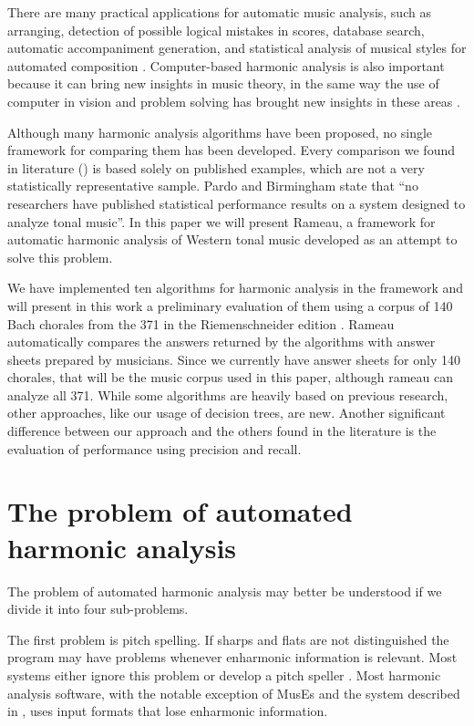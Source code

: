 \documentclass{article}
\begin{document}
There are many practical applications for automatic music analysis,
such as arranging, detection of possible logical mistakes in scores,
database search, automatic accompaniment generation, and statistical
analysis of musical styles for automated composition
\cite{pardo.ea:algorithms,temperley.ea:modeling}. Computer-based
harmonic analysis is also important because it can bring new insights
in music theory, in the same way the use of computer in vision and
problem solving has brought new insights in these areas
\cite{temperley.ea:modeling}.

Although many harmonic analysis algorithms have been proposed, no
single framework for comparing them has been developed. Every
comparison we found in literature (\cite{pardo.ea:automated,
  barthelemy.ea:figured, tsui:harmonic, taube:automatic,
  illescas.ea:harmonic}) is based solely on published examples, which
are not a very statistically representative sample. Pardo and
Birmingham \cite{pardo.ea:automated} state that ``no researchers have
published statistical performance results on a system designed to
analyze tonal music''. In this paper we will present Rameau, a
framework for automatic harmonic analysis of Western tonal music
developed as an attempt to solve this problem.

We have implemented ten algorithms for harmonic analysis in the
framework and will present in this work a preliminary evaluation of
them using a corpus of 140 Bach chorales from the 371 in the
Riemenschneider edition \cite{bach:371}. Rameau automatically compares
the answers returned by the algorithms with answer sheets prepared by
musicians. Since we currently have answer sheets for only 140
chorales, that will be the music corpus used in this paper, although
rameau can analyze all 371. While some algorithms are heavily based on
previous research, other approaches, like our usage of decision trees,
are new. Another significant difference between our approach and the
others found in the literature is the evaluation of performance using
precision and recall.

\section{The problem of automated harmonic analysis}
\label{sec:problem}

The problem of automated harmonic analysis may better be understood if
we divide it into four sub-problems.

The first problem is pitch spelling. If sharps and flats are not
distinguished the program may have problems whenever enharmonic
information is relevant. Most systems either ignore this problem or
develop a pitch speller \cite{temperley.ea:modeling}. Most harmonic
analysis software, with the notable exception of MusEs
\cite{pachet.ea:representing} and the system described in
\cite{illescas.ea:harmonic}, uses input formats that lose enharmonic
information.
\end{document}

